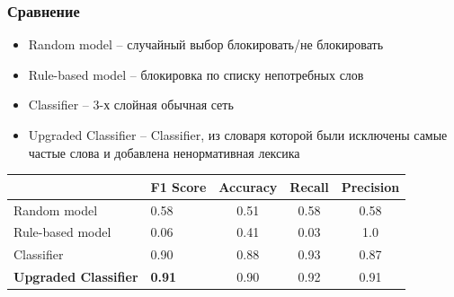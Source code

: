 \documentclass[xetex,mathserif,serif]{beamer}
\begin{document}
	\begin{frame}
		\frametitle{Сравнение}
    		\begin{itemize}
    			\item Random model – случайный выбор блокировать/не блокировать
    			\item Rule-based model – блокировка по списку непотребных слов
    			\item Classifier – 3-х слойная обычная сеть
    			\item Upgraded Classifier – Classifier, из словаря которой были исключены самые частые слова и добавлена ненормативная лексика
    		\end{itemize}
            \begin{table}[]
            \begin{tabular}{|l|l|c|c|c|}
            \hline
                                         & F1 Score      & Accuracy & Recall & Precision \\ \hline
            Random model                 & 0.58          & 0.51     & 0.58   & 0.58      \\ \hline
            Rule-based model             & 0.06          & 0.41     & 0.03   & 1.0       \\ \hline
            Classifier                   & 0.90          & 0.88     & 0.93   & 0.87      \\ \hline
            \textbf{Upgraded Classifier} & \textbf{0.91} & 0.90     & 0.92   & 0.91      \\ \hline
            \end{tabular}
            \end{table}

	\end{frame}		
	
\end{document}
